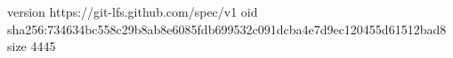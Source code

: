 version https://git-lfs.github.com/spec/v1
oid sha256:734634bc558c29b8ab8e6085fdb699532c091dcba4e7d9ec120455d61512bad8
size 4445
